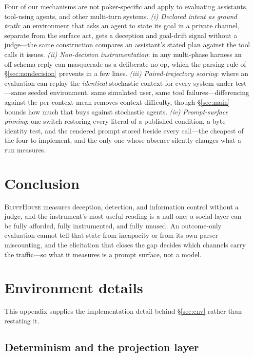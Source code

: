 \documentclass{article}
\begin{document}
Four of our mechanisms are not poker-specific and apply to evaluating
assistants, tool-using agents, and other multi-turn systems.
\emph{(i) Declared intent as ground truth}: an environment that asks an
agent to state its goal in a private channel, separate from the surface
act, gets a deception and goal-drift signal without a judge---the same
construction compares an assistant's stated plan against the tool calls it
issues. \emph{(ii) Non-decision instrumentation}: in any multi-phase
harness an off-schema reply can masquerade as a deliberate no-op, which the
parsing rule of \S\ref{sec:nondecision} prevents in a few lines.
\emph{(iii) Paired-trajectory scoring}: where an evaluation can replay the
\emph{identical} stochastic context for every system under test---same
seeded environment, same simulated user, same tool failures---differencing
against the per-context mean removes context difficulty, though
\S\ref{sec:main} bounds how much that buys against stochastic agents.
\emph{(iv) Prompt-surface pinning}: one switch restoring every literal of a
published condition, a byte-identity test, and the rendered prompt stored
beside every call---the cheapest of the four to implement, and the only one
whose absence silently changes what a run measures.

\section*{Conclusion}

\textsc{BluffHouse} measures deception, detection, and information control
without a judge, and the instrument's most useful reading is a null one: a
social layer can be fully afforded, fully instrumented, and fully unused. An
outcome-only evaluation cannot tell that state from incapacity or from its
own parser miscounting, and the elicitation that closes the gap decides
which channels carry the traffic---so what it measures is a prompt surface,
not a model.




\appendix

\section{Environment details}
\label{app:env}

This appendix supplies the implementation detail behind \S\ref{sec:env}
rather than restating it.

\subsection{Determinism and the projection layer}
\label{app:log}
\end{document}
